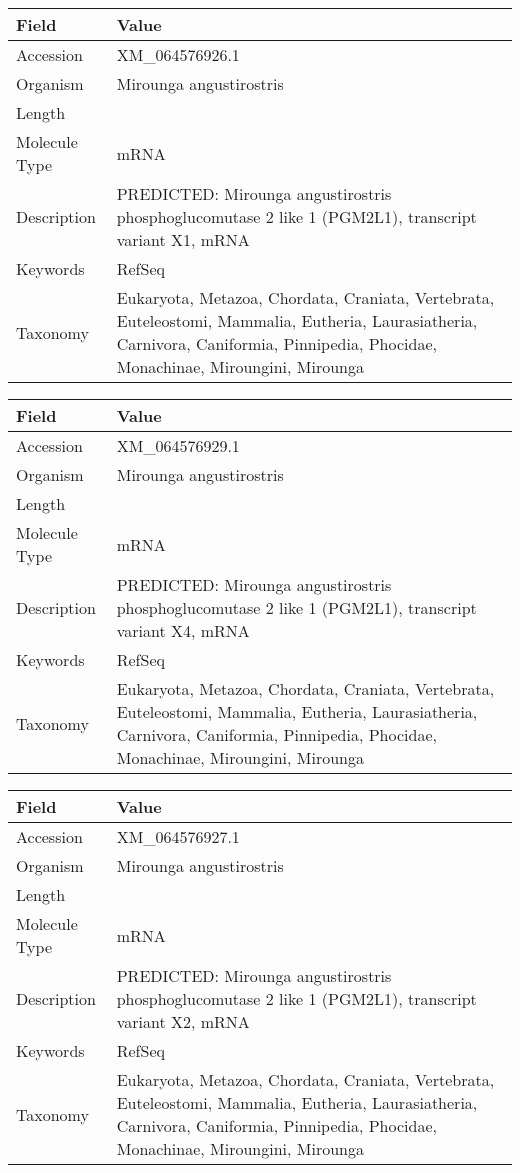 \documentclass[10pt]{article}
\begin{document}
{\footnotesize
\begin{longtable}{>{\raggedright\arraybackslash}p{4.5cm} >{\raggedright\arraybackslash}p{11.5cm}}
\textbf{Field} & \textbf{Value} \\
\hline
Accession & XM\_064576926.1 \\
Organism & Mirounga angustirostris \\
Length & 8296 \\
Molecule Type & mRNA \\
Description & PREDICTED: Mirounga angustirostris phosphoglucomutase 2 like 1 (PGM2L1), transcript variant X1, mRNA \\
Keywords & RefSeq \\
Taxonomy & Eukaryota, Metazoa, Chordata, Craniata, Vertebrata, Euteleostomi, Mammalia, Eutheria, Laurasiatheria, Carnivora, Caniformia, Pinnipedia, Phocidae, Monachinae, Miroungini, Mirounga \\
\end{longtable}
}

{\footnotesize
\begin{longtable}{>{\raggedright\arraybackslash}p{4.5cm} >{\raggedright\arraybackslash}p{11.5cm}}
\textbf{Field} & \textbf{Value} \\
\hline
Accession & XM\_064576929.1 \\
Organism & Mirounga angustirostris \\
Length & 7948 \\
Molecule Type & mRNA \\
Description & PREDICTED: Mirounga angustirostris phosphoglucomutase 2 like 1 (PGM2L1), transcript variant X4, mRNA \\
Keywords & RefSeq \\
Taxonomy & Eukaryota, Metazoa, Chordata, Craniata, Vertebrata, Euteleostomi, Mammalia, Eutheria, Laurasiatheria, Carnivora, Caniformia, Pinnipedia, Phocidae, Monachinae, Miroungini, Mirounga \\
\end{longtable}
}

{\footnotesize
\begin{longtable}{>{\raggedright\arraybackslash}p{4.5cm} >{\raggedright\arraybackslash}p{11.5cm}}
\textbf{Field} & \textbf{Value} \\
\hline
Accession & XM\_064576927.1 \\
Organism & Mirounga angustirostris \\
Length & 8127 \\
Molecule Type & mRNA \\
Description & PREDICTED: Mirounga angustirostris phosphoglucomutase 2 like 1 (PGM2L1), transcript variant X2, mRNA \\
Keywords & RefSeq \\
Taxonomy & Eukaryota, Metazoa, Chordata, Craniata, Vertebrata, Euteleostomi, Mammalia, Eutheria, Laurasiatheria, Carnivora, Caniformia, Pinnipedia, Phocidae, Monachinae, Miroungini, Mirounga \\
\end{longtable}
}
\end{document}
